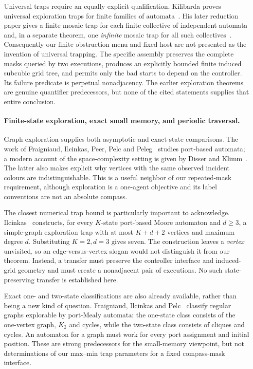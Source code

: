 Universal traps require an equally explicit qualification. Kilibarda proves
universal exploration traps for finite families of automata~\cite[Theorems~1.2--1.3]{Kilibarda1990}.
His later reduction paper gives a finite mosaic trap for each finite collective of independent automata and,
in a separate theorem, one \emph{infinite} mosaic trap for all such
collectives~\cite[Theorems~3.5 and~3.8]{KilibardaReduction2021}. Consequently our
finite obstruction menu and fixed host are not presented as the invention of
universal trapping. The specific assembly preserves the complete masks queried by
two executions, produces an explicitly bounded finite induced subcubic grid tree,
and permits only the bad starts to depend on the controller. Its failure predicate
is perpetual nonadjacency. The earlier exploration theorems are genuine quantifier
predecessors, but none of the cited statements supplies that entire conclusion.

\paragraph{Finite-state exploration, exact small memory, and periodic traversal.}
Graph exploration supplies both asymptotic and exact-state comparisons. The work
of Fraigniaud, Ilcinkas, Peer, Pelc and Peleg~\cite{FraigniaudEtAl2005} studies
port-based automata; a modern account of the space-complexity setting is given by
Disser and Klimm~\cite{DisserKlimm2022}. The latter also makes explicit why vertices
with the same observed incident colours are indistinguishable. This is a useful
neighbor of our repeated-mask requirement, although exploration is a one-agent
objective and its label conventions are not an absolute compass.

The closest numerical trap bound is particularly important to acknowledge.
Ilcinkas~\cite[Theorem~2.1, p.~52]{Ilcinkas2006} constructs, for every $K$-state
port-based Moore automaton and $d\ge3$, a simple-graph exploration trap with at most
$K+d+2$ vertices and maximum degree $d$. Substituting $K=2,d=3$ gives seven.
The construction leaves a \emph{vertex} unvisited, so an edge-versus-vertex slogan
would not distinguish it from our theorem. Instead, a transfer must preserve the
controller interface and induced-grid geometry and must create a nonadjacent pair
of executions. No such state-preserving transfer is established here.

Exact one- and two-state classifications are also already available, rather than
being a new kind of question. Fraigniaud, Ilcinkas and
Pelc~\cite{FraigniaudIlcinkasPelc2008} classify regular graphs explorable by
port-Mealy automata: the one-state class consists of the one-vertex graph, $K_2$ and
cycles, while the two-state class consists of cliques and cycles. An automaton for
a graph must work for every port assignment and initial position. These are strong
predecessors for the small-memory viewpoint, but not determinations of our
max--min trap parameters for a fixed compass-mask interface.

